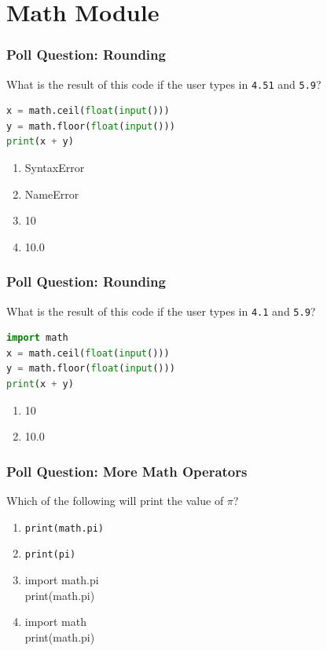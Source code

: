 \documentclass{beamer}
\begin{document}
\section{Math Module}

%
%
%
\begin{frame}[fragile]
  \frametitle{Poll Question: Rounding}
  What is the result of this code if the user types in \lstinline|4.51| and \lstinline|5.9|?
  \begin{lstlisting}[language=Python, autogobble]
x = math.ceil(float(input()))
y = math.floor(float(input()))
print(x + y)
  \end{lstlisting}
  \vfill
  \begin{enumerate}[A]
    \item SyntaxError
    \item NameError
    \item 10
    \item 10.0
  \end{enumerate}
\end{frame}

%
%
%
\begin{frame}[fragile]
  \frametitle{Poll Question: Rounding}
  What is the result of this code if the user types in \lstinline|4.1| and \lstinline|5.9|?
  \begin{lstlisting}[language=Python, autogobble]
import math
x = math.ceil(float(input()))
y = math.floor(float(input()))
print(x + y)
  \end{lstlisting}
  \vfill
  \begin{enumerate}[A]
    \item 10
    \item 10.0
  \end{enumerate}
\end{frame}

%
%
%
\begin{frame}[fragile]
  \frametitle{Poll Question: More Math Operators}
  \vfill
  Which of the following will print the value of $\pi$?
  \begin{enumerate}[A]
    \item \lstinline|print(math.pi)|
    \item \lstinline|print(pi)|
    \item import math.pi\\print(math.pi)
    \item import math\\print(math.pi)
  \end{enumerate}
\end{frame}
\end{document}
